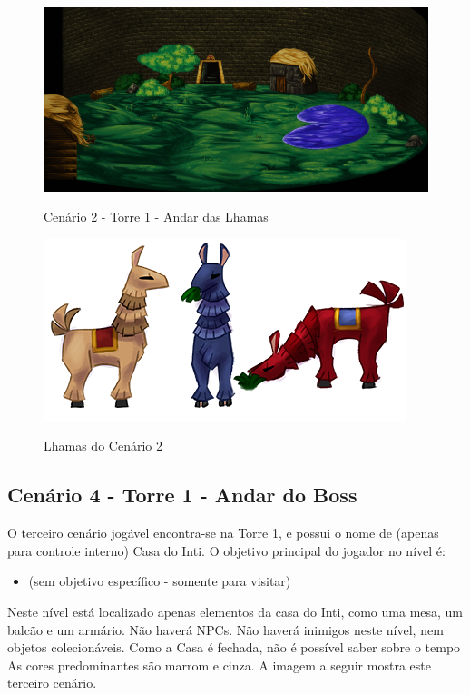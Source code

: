 \documentclass[12pt]{article}
\begin{document}
\begin{figure}[!htb]
	\centering
    \includegraphics[scale=0.45]{cenario_02.png}
    \label{fig:cenario_02}
    \caption{Cenário 2 - Torre 1 - Andar das Lhamas}
\end{figure}

\begin{figure}[!htb]
	\centering
    \includegraphics[scale=0.4]{lhamas.png}
    \label{fig:lhamas}
    \caption{Lhamas do Cenário 2}
\end{figure}

\newpage

\subsection{Cenário 4 - Torre 1 - Andar do Boss}

O terceiro cenário jogável encontra-se na Torre 1, e possui o nome de (apenas
para controle interno) Casa do Inti. O objetivo principal do jogador no
nível é:

\begin{itemize}
    \item (sem objetivo específico - somente para visitar)
\end{itemize}

Neste nível está localizado apenas elementos da casa do Inti, como uma mesa,
um balcão e um armário. Não haverá NPCs. Não haverá inimigos neste nível, nem
objetos colecionáveis. Como a Casa é fechada, não é possível saber sobre o tempo
As cores predominantes são marrom e cinza. A imagem a seguir mostra este
terceiro cenário.
\end{document}
